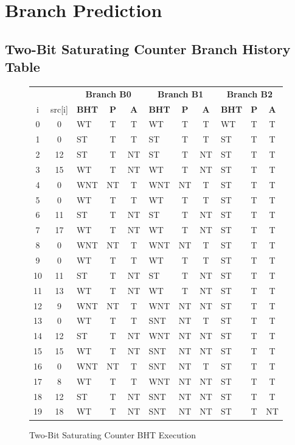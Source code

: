 \documentclass[10pt]{article}
\begin{document}
\cleardoublepage
\section{Branch Prediction}

\subsection{Two-Bit Saturating Counter Branch History Table}

\begin{figure}[H]
\centering
{
\begin{tabular}{@{\extracolsep{3pt}}cclcclcclcc@{}}
\hline
& & \multicolumn{3}{c}{\textbf{Branch B0}} & \multicolumn{3}{c}{\textbf{Branch B1}} & \multicolumn{3}{c}{\textbf{Branch B2}}\\
\cline{3-5}
\cline{6-8}
\cline{9-11}
i & src[i] & \textbf{BHT} & \textbf{P} & \textbf{A} & \textbf{BHT} & \textbf{P} & \textbf{A} & \textbf{BHT} & \textbf{P} & \textbf{A} \\ \hline
0 & 0 & WT& T & T & WT& T & T & WT& T & T \\ \hline
1 & 0 & ST& T & T & ST& T & T & ST& T & T \\ \hline
2 & 12& ST& T & NT& ST& T & NT& ST& T & T \\ \hline
3 & 15& WT& T & NT& WT& T & NT& ST& T & T \\ \hline
4 & 0 &WNT& NT& T &WNT& NT& T & ST& T & T \\ \hline
5 & 0 & WT& T & T & WT& T & T & ST& T & T \\ \hline
6 & 11& ST& T & NT& ST& T & NT& ST& T & T \\ \hline
7 & 17& WT& T & NT& WT& T & NT& ST& T & T \\ \hline
8 & 0 &WNT& NT& T &WNT& NT& T & ST& T & T \\ \hline
9 & 0 & WT& T & T & WT& T & T & ST& T & T \\ \hline
10& 11& ST& T & NT& ST& T & NT& ST& T & T \\ \hline
11& 13& WT& T & NT& WT& T & NT& ST& T & T \\ \hline
12& 9 &WNT& NT& T &WNT& NT& NT& ST& T & T \\ \hline
13& 0 & WT& T & T &SNT& NT& T & ST& T & T \\ \hline
14& 12& ST& T & NT&WNT& NT& NT& ST& T & T \\ \hline
15& 15& WT& T & NT&SNT& NT& NT& ST& T & T \\ \hline
16& 0 &WNT& NT& T &SNT& NT& T & ST& T & T \\ \hline
17& 8 & WT& T & T &WNT& NT& NT& ST& T & T \\ \hline
18& 12& ST& T & NT&SNT& NT& NT& ST& T & T \\ \hline
19& 18& WT& T & NT&SNT& NT& NT& ST& T & NT\\ \hline
\end{tabular}
}
\caption{Two-Bit Saturating Counter BHT Execution}
\end{figure}
\end{document}

